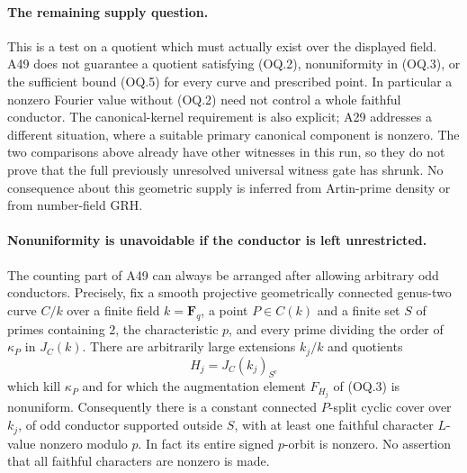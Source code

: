 \documentclass[11pt,a4paper]{article}
\begin{document}
\paragraph{The remaining supply question.}
This is a test on a quotient which must actually exist over the
displayed field. A49 does not guarantee a quotient satisfying
(OQ.2), nonuniformity in (OQ.3), or the sufficient bound (OQ.5)
for every curve and prescribed point. In particular a nonzero
Fourier value without (OQ.2) need not control a whole faithful
conductor. The canonical-kernel requirement is also explicit;
A29 addresses a different situation, where a suitable primary
canonical component is nonzero. The two comparisons above
already have other witnesses in this run, so they do not prove
that the full previously unresolved universal witness gate has
shrunk. No consequence about this geometric supply is inferred
from Artin-prime density or from number-field GRH.


\paragraph{Nonuniformity is unavoidable if the conductor is left unrestricted.}
The counting part of A49 can always be arranged after allowing
arbitrary odd conductors. Precisely, fix a smooth projective
geometrically connected genus-two curve $C/k$ over a finite field
$k=\mathbf F_q$, a point $P\in C(k)$ and a finite set $S$ of primes containing
$2$, the characteristic $p$, and every prime dividing the order
of $\kappa_P$ in $J_C(k)$.
There are arbitrarily large extensions $k_j/k$ and quotients
\[
 H_j=J_C(k_j)_{S^c}
\]
which kill $\kappa_P$ and for which the augmentation element
$F_{H_j}$ of (OQ.3) is nonuniform.
Consequently there is a constant connected $P$-split cyclic cover
over $k_j$, of odd conductor supported outside $S$, with at least
one faithful character $L$-value nonzero modulo $p$.
In fact its entire signed $p$-orbit is nonzero. No assertion that
all faithful characters are nonzero is made.
\end{document}
